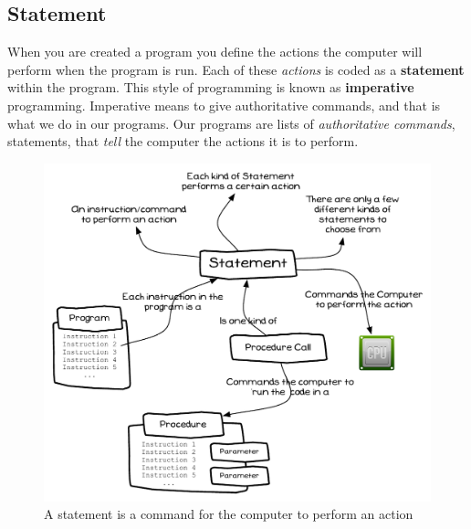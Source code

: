 \clearpage
\subsection{Statement} %
\label{sub:statement}

When you are created a program you define the actions the computer will perform when the program is run. Each of these \emph{actions} is coded as a \textbf{statement} within the program. This style of programming is known as \textbf{imperative} programming. Imperative means to give authoritative commands, and that is what we do in our programs. Our programs are lists of \emph{authoritative commands}, statements, that \emph{tell} the computer the actions it is to perform.

\begin{figure}[h]
   \centering
   \includegraphics[width=\textwidth]{./topics/program-creation/diagrams/Statement} 
   \caption{A statement is a command for the computer to perform an action}
   \label{fig:program-creation-statement}
\end{figure}



